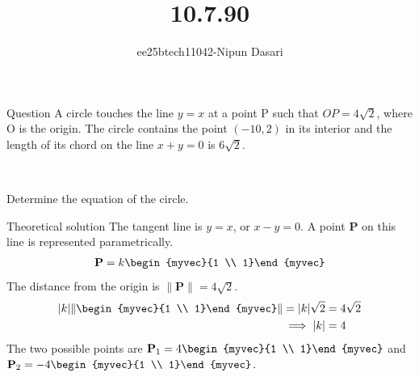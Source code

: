 \documentclass{beamer}
\title{10.7.90}
\author{ee25btech11042-Nipun Dasari}
\numberwithin{equation}{section}
\theoremstyle{remark}
\providecommand{\norm}[1]{\lVert#1\rVert}
\let\vec\mathbf
\begin{document}
	
	\begin{frame}
		\titlepage
	\end{frame}
	
	\begin{frame}{Question}
		\large
		A circle touches the line $y=x$ at a point P such that $OP=4\sqrt{2}$, where O is the origin. The circle contains the point $(-10,2)$ in its interior and the length of its chord on the line $x+y=0$ is $6\sqrt{2}$.
		
		\
		
		Determine the equation of the circle.
	\end{frame}
	
	\begin{frame}{Theoretical solution}
		The tangent line is $y=x$, or $x-y=0$. A point $\vec{P}$ on this line is represented parametrically.
		\begin{align}
			\vec{P} = k\begin{myvec}{1 \\ 1}\end{myvec}
		\end{align}
		The distance from the origin is $\norm{\vec{P}} = 4\sqrt{2}$.
		\begin{align}
			|k|\norm{\begin{myvec}{1 \\ 1}\end{myvec}} = |k|\sqrt{2} &= 4\sqrt{2} \nonumber \\
			\implies |k| &= 4
		\end{align}
		The two possible points are $\vec{P}_1=4\begin{myvec}{1 \\ 1}\end{myvec}$ and $\vec{P}_2=-4\begin{myvec}{1 \\ 1}\end{myvec}$.
	\end{frame}
	
\end{document}
